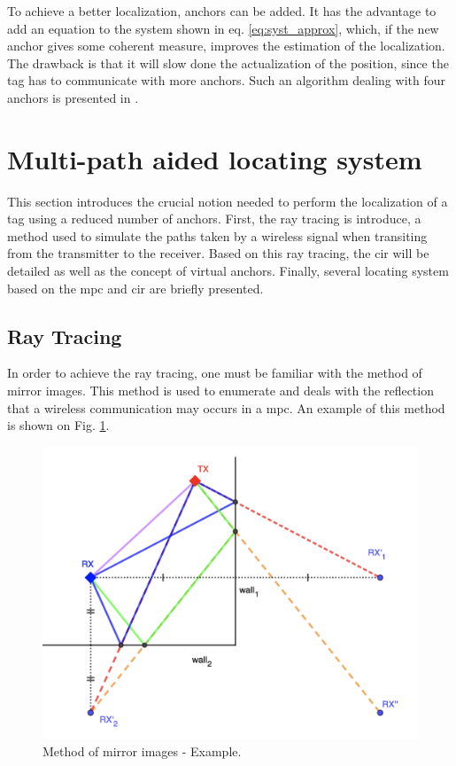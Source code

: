 To achieve a better localization, anchors can be added. It has the advantage to add an equation to the system shown in eq. \ref{eq:syst_approx}, which, if the new anchor gives some coherent measure, improves the estimation of the localization. The drawback is that it will slow done the actualization of the position, since the tag has to communicate with more anchors. Such an algorithm dealing with four anchors is presented in \cite{guyard2019navigation}.

\section{Multi-path aided locating system}
\label{mpls}

This section introduces the crucial notion needed to perform the localization of a tag using a reduced number of anchors. First, the ray tracing is introduce, a method used to simulate the paths taken by a wireless signal when transiting from the transmitter to the receiver. Based on this ray tracing, the \gls{cir} will be detailed as well as the concept of virtual anchors. Finally, several locating system based on the \gls{mpc} and \gls{cir} are briefly presented. 

\subsection{Ray Tracing}
\label{ray_tracing}

In order to achieve the ray tracing, one must be familiar with the method of mirror images. This method is used to enumerate and deals with the reflection that a wireless communication may occurs in a \gls{mpc}. An example of this method is shown on Fig. \ref{fig:image_method}. 

\begin{figure}[H]
\centering
\includegraphics[width=.7\linewidth]{Images/mirror_image.png}
\caption{Method of mirror images - Example. \label{fig:image_method}}
\end{figure}

